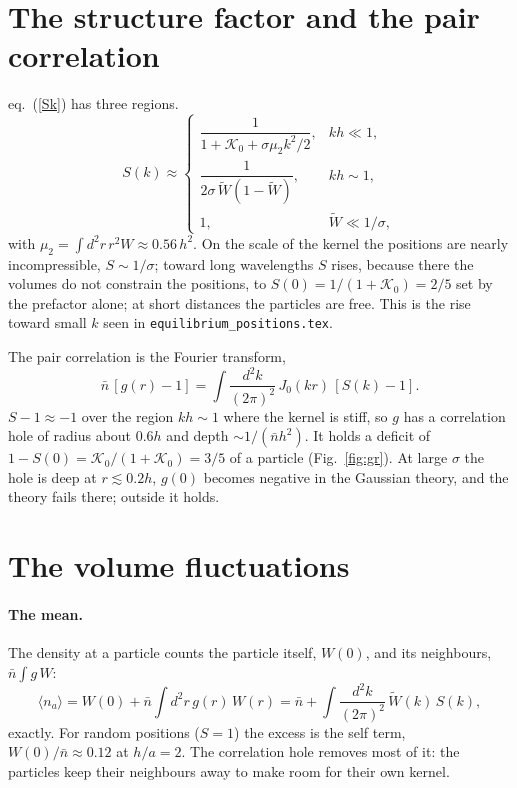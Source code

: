 \documentclass[11pt,aps,preprint,nofootinbib,superscriptaddress,tightenlines]{revtex4-2}
\newcommand{\avg}[1]{\langle #1\rangle}
\def\st{\begin{equation}}
\def\stp{\end{equation}}
\def\Eq#1{eq.~(\ref{#1})}
\def\Fig#1{Fig.~\ref{#1}}
\let\oldparagraph\paragraph
\renewcommand{\paragraph}{\par\bigskip\oldparagraph}
\begin{document}
\section{The structure factor and the pair correlation}
\label{sec:sk}

\Eq{Sk} has three regions.
\st
S(k)\approx\begin{cases}
\dfrac{1}{1+\mathcal K_0+\sigma\mu_2k^2/2},& kh\ll1,\\[2ex]
\dfrac1{2\sigma\,\widetilde W(1-\widetilde W)},& kh\sim1,\\[2ex]
1,& \widetilde W\ll1/\sigma,
\end{cases}
\label{regions}
\stp
with $\mu_2=\int d^2r\,r^2W\approx0.56\,h^2$.  On the scale of the kernel the positions are nearly incompressible, $S\sim1/\sigma$; toward long
wavelengths $S$ rises, because there the volumes do not constrain the positions, to $S(0)=1/(1+\mathcal K_0)=2/5$ set by the prefactor alone; at short distances the
particles are free.  This is the rise toward small $k$ seen in \texttt{equilibrium\_positions.tex}.

The pair correlation is the Fourier transform,
\st
\bar n\,[g(r)-1]=\int\frac{d^2k}{(2\pi)^2}\,J_0(kr)\,[S(k)-1] .
\stp
$S-1\approx-1$ over the region $kh\sim1$ where the kernel is stiff, so $g$ has a correlation hole of radius about $0.6h$ and depth $\sim1/(\bar nh^2)$.  It
holds a deficit of $1-S(0)=\mathcal K_0/(1+\mathcal K_0)=3/5$ of a particle (\Fig{fig:gr}).  At large $\sigma$ the hole is deep at $r\lesssim0.2h$, $g(0)$ becomes negative in the
Gaussian theory, and the theory fails there; outside it holds.

\section{The volume fluctuations}
\label{sec:volume}

\paragraph{The mean.}  The density at a particle counts the particle itself, $W(0)$, and its neighbours, $\bar n\int g\,W$:
\st
\avg{n_a}=W(0)+\bar n\int d^2r\,g(r)\,W(r)=\bar n+\int\frac{d^2k}{(2\pi)^2}\,\widetilde W(k)\,S(k),
\label{mean}
\stp
exactly.  For random positions ($S=1$) the excess is the self term, $W(0)/\bar n\approx0.12$ at $h/a=2$.  The correlation hole removes most of it:
the particles keep their neighbours away to make room for their own kernel.
\end{document}
